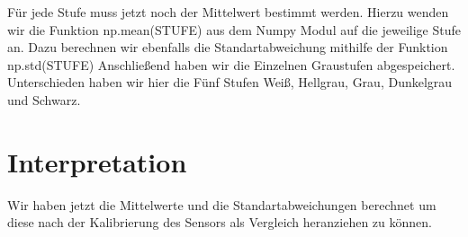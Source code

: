 \documentclass[TGAI_Laborbericht.tex]{subfiles}
\begin{document}
Für jede Stufe muss jetzt noch der Mittelwert bestimmt werden. Hierzu wenden wir die Funktion np.mean(STUFE) aus dem Numpy Modul auf die jeweilige Stufe an. Dazu berechnen wir ebenfalls die Standartabweichung mithilfe der Funktion np.std(STUFE) Anschließend haben wir die Einzelnen Graustufen abgespeichert. Unterschieden haben wir hier die Fünf Stufen Weiß, Hellgrau, Grau, Dunkelgrau und Schwarz.

\section{Interpretation}
\label{chap:VERSUCH_1_INTERPRETATION}
Wir haben jetzt die Mittelwerte und die Standartabweichungen berechnet um diese nach der Kalibrierung des Sensors als Vergleich heranziehen zu können.
\end{document}
